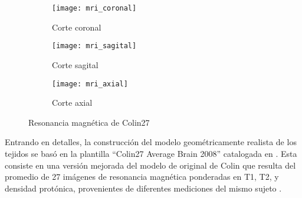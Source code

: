 \begin{figure}[tb]
	\centering
	\begin{subfigure}{0.49\textwidth}
		\centering
		\texttt{[image: mri\_coronal]}
		\caption{Corte coronal}
		\label{fig:methodology:coronal}
		\vspace{0.1cm} %
	\end{subfigure}
	\begin{subfigure}{0.49\textwidth}
		\centering
		\texttt{[image: mri\_sagital]}
		\caption{Corte sagital}
		\label{fig:methodology:sagital}
		\vspace{0.1cm} %
	\end{subfigure}
	\begin{subfigure}{0.49\textwidth}
		\centering
		\texttt{[image: mri\_axial]}
		\caption{Corte axial}
		\label{fig:methodology:axial}
	\end{subfigure}
	\caption{Resonancia magnética de Colin27 \cite{Aubert-Broche2006}}
	\label{fig:methodology:mri}
\end{figure}

Entrando en detalles, la construcción del modelo geométricamente realista de los tejidos se basó en la plantilla ``Colin27 Average Brain 2008'' catalogada en \cite{Aubert-Broche2006}. Esta consiste en una versión mejorada del modelo de original de Colin que resulta del promedio de 27 imágenes de resonancia magnética ponderadas en T1, T2, y densidad protónica, provenientes de diferentes mediciones del mismo sujeto \cite{Collins1998, Holmes1998}.

